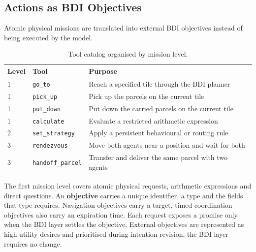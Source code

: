 \documentclass[11pt,a4paper]{article}
\begin{document}
\subsection{Actions as BDI Objectives}
Atomic physical missions are translated into external BDI objectives instead of being executed by the model.
\begin{table}[H]
    \centering
    \begin{tabular}{llp{8.5cm}}
        \toprule
        \textbf{Level} & \textbf{Tool} & \textbf{Purpose} \\
        \midrule
        1 & \texttt{go\_to} & Reach a specified tile through the BDI planner \\
        1 & \texttt{pick\_up} & Pick up the parcels on the current tile \\
        1 & \texttt{put\_down} & Put down the carried parcels on the current tile \\
        1 & \texttt{calculate} & Evaluate a restricted arithmetic expression \\
        2 & \texttt{set\_strategy} & Apply a persistent behavioural or routing rule \\
        3 & \texttt{rendezvous} & Move both agents near a position and wait for both \\
        3 & \texttt{handoff\_parcel} & Transfer and deliver the same parcel with two agents \\
        \bottomrule
    \end{tabular}
    \caption{Tool catalog organised by mission level.}
\end{table}
The first mission level covers atomic physical requests, arithmetic expressions and direct questions.
An \textbf{objective} carries a unique identifier, a type and the fields that type requires.
Navigation objectives carry a target, timed coordination objectives also carry an expiration time.
Each request exposes a promise only when the BDI layer settles the objective.
External objectives are represented as high utility desires and prioritised during intention revision, the BDI layer requires no change.
\end{document}
